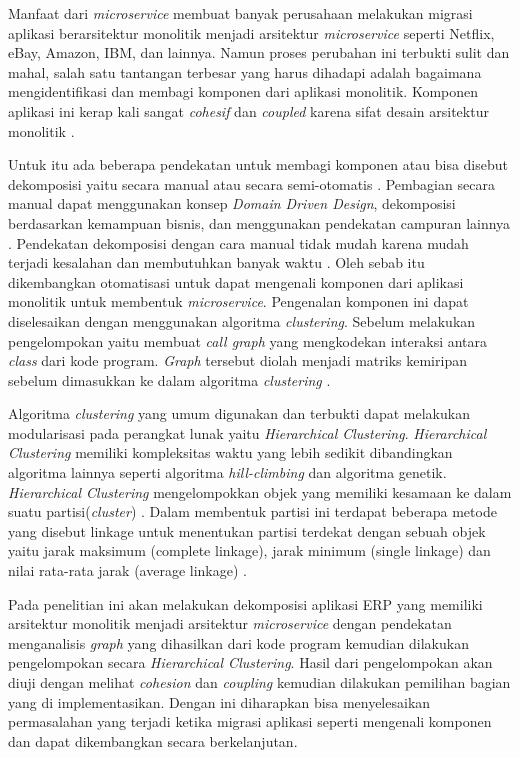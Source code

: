 Manfaat dari \textit{microservice} membuat banyak perusahaan melakukan migrasi aplikasi berarsitektur monolitik menjadi arsitektur \textit{microservice} seperti Netflix, eBay, Amazon, IBM, dan lainnya. Namun proses perubahan ini terbukti sulit dan mahal, salah satu tantangan terbesar yang harus dihadapi adalah bagaimana mengidentifikasi dan membagi komponen dari aplikasi monolitik. Komponen aplikasi ini kerap kali sangat \textit{cohesif} dan  \textit{coupled} karena sifat desain arsitektur monolitik \cite{ECD}.

Untuk itu ada beberapa pendekatan untuk membagi komponen atau bisa disebut dekomposisi yaitu secara manual atau secara semi-otomatis \cite{5B1}. Pembagian secara manual dapat menggunakan konsep \textit{Domain Driven Design}, dekomposisi berdasarkan kemampuan bisnis, dan menggunakan pendekatan campuran lainnya \cite{6C1}. Pendekatan dekomposisi dengan cara manual tidak mudah karena mudah terjadi kesalahan dan membutuhkan banyak waktu  \cite{5B1}. Oleh sebab itu dikembangkan otomatisasi untuk dapat mengenali komponen dari aplikasi monolitik untuk membentuk \textit{microservice}. Pengenalan komponen ini dapat diselesaikan dengan menggunakan algoritma \textit{clustering}. Sebelum melakukan pengelompokan yaitu membuat \textit{call graph} yang mengkodekan interaksi antara \textit{class} dari kode program. \textit{Graph} tersebut diolah menjadi matriks kemiripan sebelum dimasukkan ke dalam algoritma \textit{clustering} \cite{ECD}.

Algoritma \textit{clustering} yang umum digunakan dan terbukti dapat melakukan modularisasi pada perangkat lunak yaitu \textit{Hierarchical Clustering}. \textit{Hierarchical Clustering} memiliki kompleksitas waktu yang lebih sedikit dibandingkan algoritma lainnya seperti algoritma \textit{hill-climbing} dan algoritma genetik. \textit{Hierarchical Clustering} mengelompokkan objek yang memiliki kesamaan ke dalam suatu partisi(\textit{cluster}) \cite{8EA}. Dalam membentuk partisi ini terdapat beberapa metode yang disebut linkage untuk menentukan partisi terdekat dengan sebuah objek yaitu  jarak maksimum (complete linkage), jarak minimum (single linkage) dan nilai rata-rata jarak (average linkage) \cite{3D3}.

Pada penelitian ini akan melakukan dekomposisi aplikasi ERP yang memiliki arsitektur monolitik menjadi arsitektur \textit{microservice} dengan pendekatan menganalisis \textit{graph} yang dihasilkan dari kode program kemudian dilakukan pengelompokan secara \textit{Hierarchical Clustering}. Hasil dari pengelompokan akan diuji dengan melihat \textit{cohesion} dan \textit{coupling} kemudian dilakukan pemilihan bagian yang di implementasikan. Dengan ini diharapkan bisa menyelesaikan permasalahan yang terjadi ketika migrasi aplikasi seperti  mengenali komponen dan dapat dikembangkan secara berkelanjutan.


